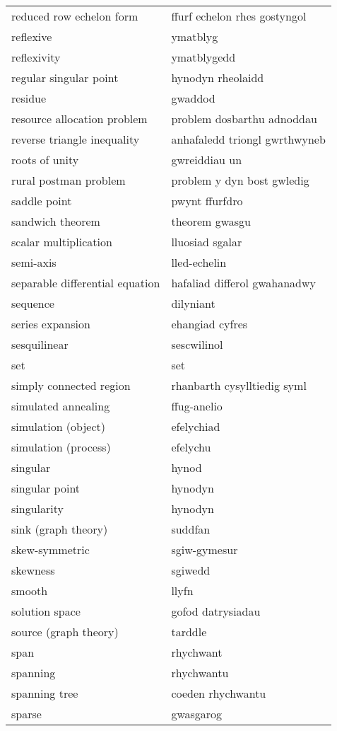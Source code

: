 \begin{supertabular}{p{0.22\textwidth}p{0.22\textwidth}}
reduced row echelon form & ffurf echelon rhes gostyngol \\
reflexive & ymatblyg \\
reflexivity & ymatblygedd \\
regular singular point & hynodyn rheolaidd \\
residue & gwaddod \\
resource allocation problem & problem dosbarthu adnoddau \\
reverse triangle inequality & anhafaledd triongl gwrthwyneb \\
roots of unity & gwreiddiau un \\
rural postman problem & problem y dyn bost gwledig \\
saddle point & pwynt ffurfdro \\
sandwich theorem & theorem gwasgu \\
scalar multiplication & lluosiad sgalar \\
semi-axis & lled-echelin \\
separable differential equation & hafaliad differol gwahanadwy \\
sequence & dilyniant \\
series expansion & ehangiad cyfres \\
sesquilinear & sescwilinol \\
set & set \\
simply connected region & rhanbarth cysylltiedig syml \\
simulated annealing & ffug-anelio \\
simulation (object) & efelychiad \\
simulation (process) & efelychu \\
singular & hynod \\
singular point & hynodyn \\
singularity & hynodyn \\
sink (graph theory) & suddfan \\
skew-symmetric & sgiw-gymesur \\
skewness & sgiwedd \\
smooth & llyfn \\
solution space & gofod datrysiadau \\
source (graph theory) & tarddle \\
span & rhychwant \\
spanning & rhychwantu \\
spanning tree & coeden rhychwantu \\
sparse & gwasgarog \\

\end{supertabular}
